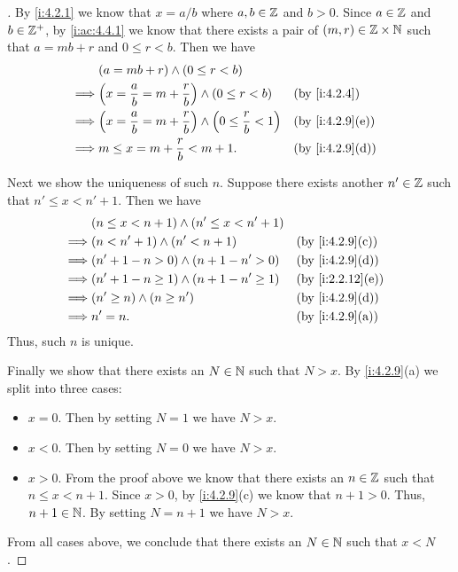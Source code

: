 \begin{proof}[]
  By \cref{i:4.2.1} we know that \(x = a / b\) where \(a, b \in \mathbb{Z}\) and \(b > 0\).
  Since \(a \in \mathbb{Z}\) and \(b \in \mathbb{Z}^+\), by \cref{i:ac:4.4.1} we know that there exists a pair of \((m, r) \in \mathbb{Z} \times \mathbb{N}\) such that \(a = mb + r\) and \(0 \leq r < b\).
  Then we have
  \begin{align*}
             & (a = mb + r) \land (0 \leq r < b)                                                                \\
    \implies & \pa{x = \dfrac{a}{b} = m + \dfrac{r}{b}} \land (0 \leq r < b)               &  & \by{i:4.2.4}    \\
    \implies & \pa{x = \dfrac{a}{b} = m + \dfrac{r}{b}} \land \pa{0 \leq \dfrac{r}{b} < 1} &  & \by{i:4.2.9}[e] \\
    \implies & m \leq x = m + \dfrac{r}{b} < m + 1.                                        &  & \by{i:4.2.9}[d]
  \end{align*}

  Next we show the uniqueness of such \(n\).
  Suppose there exists another \(n' \in \mathbb{Z}\) such that \(n' \leq x < n' + 1\).
  Then we have
  \begin{align*}
             & (n \leq x < n + 1) \land (n' \leq x < n' + 1)                       \\
    \implies & (n < n' + 1) \land (n' < n + 1)               &  & \by{i:4.2.9}[c]  \\
    \implies & (n' + 1 - n > 0) \land (n + 1 - n' > 0)       &  & \by{i:4.2.9}[d]  \\
    \implies & (n' + 1 - n \geq 1) \land (n + 1 - n' \geq 1) &  & \by{i:2.2.12}[e] \\
    \implies & (n' \geq n) \land (n \geq n')                 &  & \by{i:4.2.9}[d]  \\
    \implies & n' = n.                                       &  & \by{i:4.2.9}[a]
  \end{align*}
  Thus, such \(n\) is unique.

  Finally we show that there exists an \(N \in \mathbb{N}\) such that \(N > x\).
  By \cref{i:4.2.9}(a) we split into three cases:
  \begin{itemize}
    \item \(x = 0\).
          Then by setting \(N = 1\) we have \(N > x\).
    \item \(x < 0\).
          Then by setting \(N = 0\) we have \(N > x\).
    \item \(x > 0\).
          From the proof above we know that there exists an \(n \in \mathbb{Z}\) such that \(n \leq x < n + 1\).
          Since \(x > 0\), by \cref{i:4.2.9}(c) we know that \(n + 1 > 0\).
          Thus, \(n + 1 \in \mathbb{N}\).
          By setting \(N = n + 1\) we have \(N > x\).
  \end{itemize}
  From all cases above, we conclude that there exists an \(N \in \mathbb{N}\) such that \(x < N\).
\end{proof}

